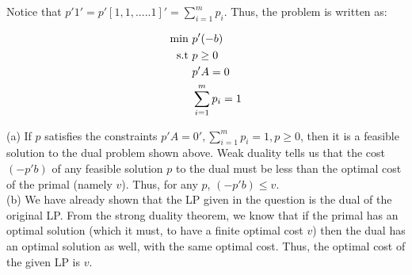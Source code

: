 Notice that $p'1' = p' [1, 1, .....1]' = \sum_{i=1}^{m} p_i$. Thus, the problem is written as:

\begin{align}
    \text{min } &p'(-b) \notag\\
    \text{s.t }  &p \ge 0  \notag\\
                &p'A = 0 \notag\\
                &\sum_{i=1}^{m} p_i = 1 \notag
\end{align}

(a) If $p$ satisfies the constraints $p'A=0', \sum_{i=1}^m p_i=1, p\geq 0$, then it is a feasible solution to the dual problem shown above. Weak duality tells us that the cost $(-p'b)$ of any feasible solution $p$ to the dual must be less than the optimal cost of the primal (namely $v$). Thus, for any $p$, $(-p'b)\leq v$.\\

(b) We have already shown that the LP given in the question is the dual of the original LP. From the strong duality theorem, we know that if the primal has an optimal solution (which it must, to have a finite optimal cost $v$) then the dual has an optimal solution as well, with the same optimal cost. Thus, the optimal cost of the given LP is $v$.